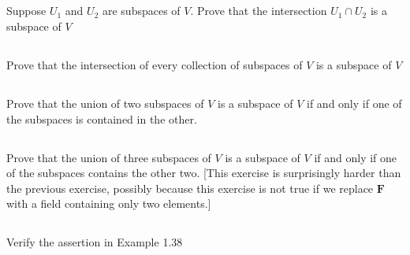 \documentclass[a4paper]{article}
\begin{document}
\paragraph{}

\subsection{}
Suppose $U_{1}$ and $U_{2}$ are subspaces of $V .$ Prove that the intersection $U_{1} \cap U_{2}$ is a subspace of $V$
\paragraph{}

\subsection{}
Prove that the intersection of every collection of subspaces of $V$ is a subspace of $V$
\paragraph{}

\subsection{}
Prove that the union of two subspaces of $V$ is a subspace of $V$ if and only if one of the subspaces is contained in the other.
\paragraph{}

\subsection{}
Prove that the union of three subspaces of $V$ is a subspace of $V$ if and only if one of the subspaces contains the other two. [This exercise is surprisingly harder than the previous exercise, possibly because this exercise is not true if we replace $\mathbf{F}$ with a field containing only two elements.]
\paragraph{}

\subsection{}
Verify the assertion in Example 1.38
\end{document}

